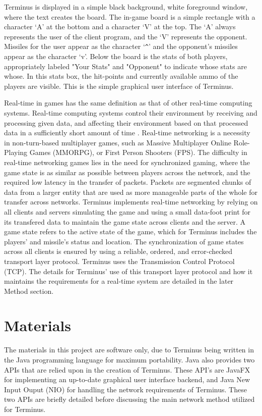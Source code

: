 \documentclass[12pt]{article}
\begin{document}
    Terminus is displayed in a simple black background, white foreground window, where the text creates the board. The in-game board is a simple rectangle with a character `A' at the bottom and a character `V' at the top. The `A' always represents the user of the client program, and the `V' represents the opponent. Missiles for the user appear as the character `\verb|^|' and the opponent's missiles appear as the character `v'. Below the board is the stats of both players, appropriately labeled "Your Stats" and "Opponent" to indicate whose stats are whose. In this stats box, the hit-points and currently available ammo of the players are visible. This is the simple graphical user interface of Terminus. 
    
    Real-time in games has the same definition as that of other real-time computing systems. Real-time computing systems control their environment by receiving and processing given data, and affecting their environment based on that processed data in a sufficiently short amount of time \cite{martin}. Real-time networking is a necessity in non-turn-based multiplayer games, such as Massive Multiplayer Online Role-Playing Games (MMORPG), or First Person Shooters (FPS). The difficulty in real-time networking games lies in the need for synchronized gaming, where the game state is as similar as possible between players across the network, and the required low latency in the transfer of packets. Packets are segmented chunks of data from a larger entity that are used as more manageable parts of the whole for transfer across networks\cite{kurose}. Terminus implements real-time networking by relying on all clients and servers simulating the game and using a small data-foot print for its transfered data to maintain the game state across clients and the server. A game state refers to the active state of the game, which for Terminus includes the players' and missile's status and location. The synchronization of game states across all clients is ensured by using a reliable,  ordered, and error-checked transport layer protocol. Terminus uses the Transmission Control Protocol (TCP). The details for Terminus' use of this transport layer protocol and how it maintains the requirements for a real-time system are detailed in the later Method section.

\section{Materials}
    The materials in this project are software only, due to Terminus being written in the Java programming language for maximum portability. Java also provides two APIs that are relied upon in the creation of Terminus. These API's are JavaFX for implementing an up-to-date graphical user interface backend, and Java New Input Ouput (NIO) for handling the network requirements of Terminus. These two APIs are briefly detailed before discussing the main network method utilized for Terminus.
\end{document}
